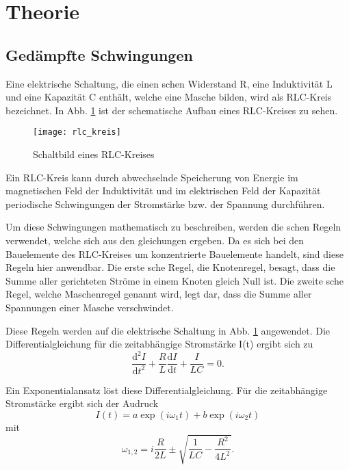 
\section{Theorie}
\subsection{Gedämpfte Schwingungen}
Eine elektrische Schaltung, die einen schen Widerstand R, eine Induktivität L und eine Kapazität C enthält, welche eine Masche bilden, wird als RLC-Kreis bezeichnet. 
In Abb. \ref{fig:rlc-kreis} ist der schematische Aufbau eines RLC-Kreises zu sehen.
%
\begin{figure}[h!!]
\centering
\texttt{[image: rlc\_kreis]}
\caption{Schaltbild eines RLC-Kreises}
\label{fig:rlc-kreis}
\end{figure}
%

Ein RLC-Kreis kann durch abwechselnde Speicherung von Energie im magnetischen Feld der Induktivität und im elektrischen Feld der Kapazität periodische Schwingungen der Stromstärke bzw. der Spannung durchführen.

Um diese Schwingungen mathematisch zu beschreiben, werden die schen Regeln verwendet, welche sich aus den gleichungen ergeben.
Da es sich bei den Bauelemente des RLC-Kreises um konzentrierte Bauelemente handelt, sind diese Regeln hier anwendbar.
Die erste sche Regel, die Knotenregel, besagt, dass die Summe aller gerichteten Ströme in einem Knoten gleich Null ist.
Die zweite sche Regel, welche Maschenregel genannt wird, legt dar, dass die Summe aller Spannungen einer Masche verschwindet.

Diese Regeln werden auf die elektrische Schaltung in Abb.  \ref{fig:rlc-kreis} angewendet. Die Differentialgleichung für die zeitabhängige Stromstärke I(t) ergibt sich zu
\begin{equation*}
\frac{\text{d}^2 I}{\text{d}t^2} + \frac{R}{L}\frac{\text{d}I}{\text{d}t} + \frac{I}{LC} = 0.
\end{equation*}

Ein Exponentialansatz löst diese Differentialgleichung. Für die zeitabhängige Stromstärke ergibt sich der Audruck
\begin{equation}
\label{eq:loesung}
I(t) = a \exp({i \omega_1 t}) + b \exp({i \omega_2 t})
\end{equation}
mit
\begin{equation*}
\omega_{1,2} = i \frac{R}{2 L} \pm \sqrt{\frac{1}{LC} - \frac{R^2}{4L^2}}.
\end{equation*}

